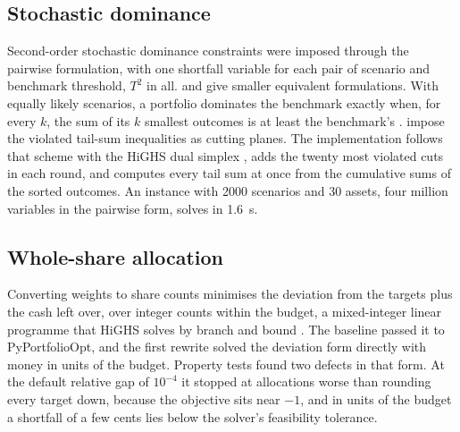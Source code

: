 \subsection{Stochastic dominance}

Second-order stochastic dominance constraints
\citep{dentcheva_optimization_2003,dentcheva_portfolio_2006,ogryczak_dual_2002,kuosmanen_efficient_2004}
were imposed through the pairwise formulation, with one shortfall variable
for each pair of scenario and benchmark threshold, $T^{2}$ in all.
\citet{luedtke_new_2008} and \citet{rudolf_optimization_2008} give smaller
equivalent formulations. With equally likely scenarios, a portfolio dominates
the benchmark exactly when, for every $k$, the sum of its $k$ smallest
outcomes is at least the benchmark's
\citep{roman_portfolio_2006,fabian_processing_2011}.
\citet{fabian_processing_2011}
impose the violated tail-sum inequalities as cutting planes. The
implementation follows that scheme with the HiGHS dual simplex
\citep{huangfu_parallelizing_2018}, adds the twenty most violated cuts in each
round, and computes every tail sum at once from the cumulative sums of the
sorted outcomes. An instance with 2000 scenarios and 30 assets, four million
variables in the pairwise form, solves in 1.6~s.

\subsection{Whole-share allocation}

Converting weights to share counts minimises the deviation from the targets
plus the cash left over, over integer counts within the budget, a
mixed-integer linear programme that HiGHS solves by branch and bound
\citep{land_automatic_1960,huangfu_parallelizing_2018}. The baseline passed it
to PyPortfolioOpt, and the first rewrite solved the deviation form directly
with money in units of the budget. Property tests found two defects in that
form. At the default relative gap of $10^{-4}$ it stopped at allocations worse
than rounding every target down, because the objective sits near $-1$, and in
units of the budget a shortfall of a few cents lies below the solver's
feasibility tolerance.


